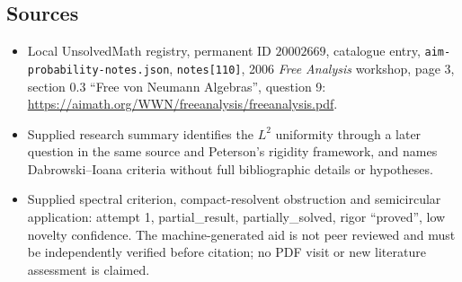 \documentclass[11pt]{article}
\begin{document}
\subsection{Sources}
\begin{itemize}
\item Local UnsolvedMath registry, permanent ID \(20002669\), catalogue entry, \texttt{aim-probability-notes.json}, \texttt{notes[110]}, 2006 \emph{Free Analysis} workshop, page 3, section 0.3 ``Free von Neumann Algebras'', question 9: \url{https://aimath.org/WWN/freeanalysis/freeanalysis.pdf}.
\item Supplied research summary identifies the \(L^2\) uniformity through a later question in the same source and Peterson's rigidity framework, and names Dabrowski--Ioana criteria without full bibliographic details or hypotheses.
\item Supplied spectral criterion, compact-resolvent obstruction and semicircular application: attempt 1, partial\_result, partially\_solved, rigor ``proved'', low novelty confidence. The machine-generated aid is not peer reviewed and must be independently verified before citation; no PDF visit or new literature assessment is claimed.
\end{itemize}
\end{document}

